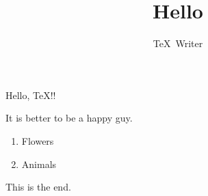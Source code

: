 \documentclass{article}
\title{Hello}
\author{\TeX\ Writer}
\date{}
\begin{document}
\maketitle

Hello, \TeX!!

It is better to be a happy guy.

\begin{enumerate}
	\item Flowers
	\item Animals
\end{enumerate}

This is the end.
\end{document}

